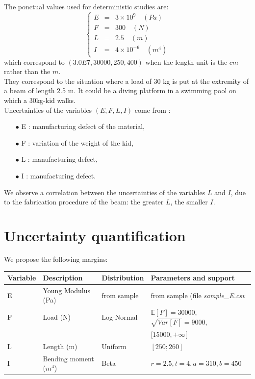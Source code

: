 \documentclass[11pt, french, A4wide]{article}
\theoremstyle{remark}
\theoremstyle{definition}
\begin{document}
The ponctual values used for deterministic studies are:
$$
\left\{
\begin{array}{lcl}
 E & = & 3 \times 10^{9} \quad (Pa)\\
 F & = & 300  \quad (N)\\
 L & = & 2.5  \quad (m)\\
 I & = & 4 \times 10^{-6}  \quad (m^4)
\end{array}
\right.
$$
which correspond to $(3.0E7, 30000, 250, 400)$ when the length unit is the $cm$ rather than the $m$.\\

They correspond to the situation where a load of 30 kg is put at the extremity of a beam of length 2.5 m. It could be a diving platform in a swimming pool on which a 30kg-kid walks. \\

Uncertainties of the variables $(E,F,L,I)$ come from :
  \begin{itemize}
    \item[$\bullet$]  E : manufacturing defect of the material,
    \item[$\bullet$]  F : variation of the weight of the kid,
    \item[$\bullet$]  L :  manufacturing defect,
    \item[$\bullet$]  I :  manufacturing defect.
  \end{itemize}
\vspace*{0.2cm}

We observe a correlation between the uncertainties of the variables $L$ and $I$, due to the fabrication procedure of the beam: the greater $L$, the smaller $I$.


\newpage
\section{Uncertainty quantification}

We propose the following margins:

\begin{table}[h!]
	\begin{tabular}{|l|l|l|l|}
	\hline
	Variable & Description            & Distribution & Parameters and support                  \\ \hline
	E        & Young Modulus (Pa)     & from sample  & from sample (file \emph{sample\_E.csv}  \\ \hline
	F        & Load (N)               & Log-Normal   & $\mathbb{E}[F] = 30000$, $\sqrt{Var[F]} = 9000$, \\
             &                        &              & $[15000, +\infty[$   \\ \hline
	L        & Length (m)             & Uniform      & $[250; 260]$            				   \\ \hline
	I        & Bending moment ($m^4$) & Beta         & $r = 2.5,t = 4,a = 310,b = 450$         \\ \hline      
	\end{tabular}
\end{table}
\end{document}
